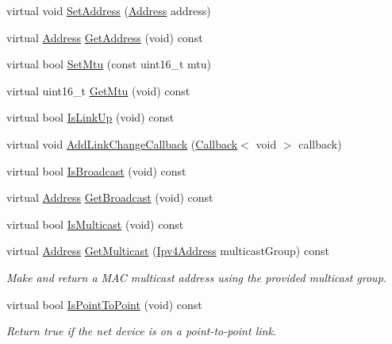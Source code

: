 \begin{DoxyCompactItemize}
\item 
virtual void \hyperlink{classns3_1_1BridgeNetDevice_a455c6aa85f8790a9588b6fd794f2d920}{Set\+Address} (\hyperlink{classns3_1_1Address}{Address} address)
\item 
virtual \hyperlink{classns3_1_1Address}{Address} \hyperlink{classns3_1_1BridgeNetDevice_a2bf34b9c7dfde567cfa90dde807185ab}{Get\+Address} (void) const 
\item 
virtual bool \hyperlink{classns3_1_1BridgeNetDevice_afc362f1047067ebf64e2f81f790f9c50}{Set\+Mtu} (const uint16\+\_\+t mtu)
\item 
virtual uint16\+\_\+t \hyperlink{classns3_1_1BridgeNetDevice_a86e660792da21b0c3eafb103cfc228c5}{Get\+Mtu} (void) const 
\item 
virtual bool \hyperlink{classns3_1_1BridgeNetDevice_ad40e11c2707ff5c012c71c288b281cce}{Is\+Link\+Up} (void) const 
\item 
virtual void \hyperlink{classns3_1_1BridgeNetDevice_ad883eed3ac45d608e4d5683992ae9e9d}{Add\+Link\+Change\+Callback} (\hyperlink{classns3_1_1Callback}{Callback}$<$ void $>$ callback)
\item 
virtual bool \hyperlink{classns3_1_1BridgeNetDevice_ac56c83ea08ab0df37ac19777a5dd8d7f}{Is\+Broadcast} (void) const 
\item 
virtual \hyperlink{classns3_1_1Address}{Address} \hyperlink{classns3_1_1BridgeNetDevice_a35c3033a90f189f94e4b5d6951630c19}{Get\+Broadcast} (void) const 
\item 
virtual bool \hyperlink{classns3_1_1BridgeNetDevice_a865db3336d37fca6cd09c46c93199a38}{Is\+Multicast} (void) const 
\item 
virtual \hyperlink{classns3_1_1Address}{Address} \hyperlink{classns3_1_1BridgeNetDevice_ab6714d1180ea4f909087418989e3851f}{Get\+Multicast} (\hyperlink{classns3_1_1Ipv4Address}{Ipv4\+Address} multicast\+Group) const 
\begin{DoxyCompactList}\small\item\em Make and return a M\+AC multicast address using the provided multicast group. \end{DoxyCompactList}\item 
virtual bool \hyperlink{classns3_1_1BridgeNetDevice_a87de7a289e4485873185a2db12dd0665}{Is\+Point\+To\+Point} (void) const 
\begin{DoxyCompactList}\small\item\em Return true if the net device is on a point-\/to-\/point link. \end{DoxyCompactList}\item 

\end{DoxyCompactItemize}
